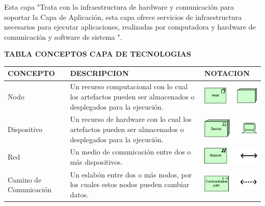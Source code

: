 Esta capa "Trata con la infraestructura de hardware y comunicación para soportar la Capa de Aplicación, esta capa ofrece servicios de infraestructura necesarios para ejecutar aplicaciones, realizadas por computadora y hardware de comunicación y software de sistema ".


\begin{table}[H]
	\centering\textbf{TABLA CONCEPTOS CAPA DE TECNOLOGIAS}
	\centering
	\begin{tabular}{| m{4cm} | m{4cm} | m{4cm} | }
		\hline
		\centering\vspace{1.52mm}CONCEPTO & \centering\vspace{1.52mm}DESCRIPCION &\vspace{1.52mm}NOTACION \\
		\hline
		\centering\vspace{1.52mm}Nodo & \vspace{1.52mm}Un recurso computacional con lo cual los artefactos pueden ser almacenados o desplegados para la ejecución.& \vspace{1.52mm}\includegraphics[width=40mm]{arquitectura/imagenes/31} \\
		\hline
		\centering\vspace{1.52mm}Dispositivo & \vspace{1.52mm}Un recurso de hardware con lo cual los artefactos pueden ser almacenados o desplegados para la ejecución.& \vspace{1.52mm}\includegraphics[width=40mm]{arquitectura/imagenes/32} \\
		\hline
		\centering\vspace{1.52mm}Red & \vspace{1.52mm}Un medio de comunicación entre dos o más dispositivos.& \vspace{1.52mm}\includegraphics[width=40mm]{arquitectura/imagenes/33} \\
		\hline
		\centering\vspace{1.52mm}Camino de Comunicación & \vspace{1.52mm}Un eslabón entre dos o más nodos, por los cuales estos nodos pueden cambiar datos.& \vspace{1.52mm}\includegraphics[width=40mm]{arquitectura/imagenes/34} \\

\end{tabular}
\end{table}
